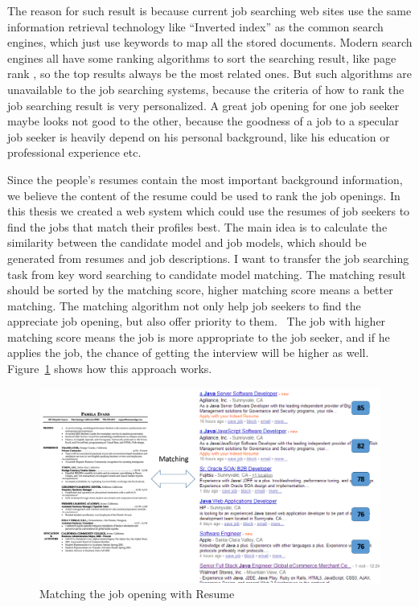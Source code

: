The reason for such result is because current job searching web sites use the same information retrieval technology like ``Inverted index'' \cite{zobel2006inverted} as the common search engines, which just use keywords to map all the stored documents. Modern search engines all have some ranking algorithms to sort the searching result, like page rank \cite{page1999pagerank}, so the top results always be the most related ones. But such algorithms are unavailable to the job searching systems, because the criteria  of how to rank the job searching result is very personalized. A great job opening for one job seeker maybe looks not good to the other, because the goodness of a job to a specular job seeker is heavily depend on his personal background, like his education or professional experience etc.

Since the people's resumes contain the most important background information, we believe the content of the resume could be used to rank the job openings. In this thesis we created a web system which could use the resumes of job seekers to find the jobs that match their profiles best. The main idea is to calculate the similarity between the candidate model and job models, which should be generated from resumes and job descriptions. I want to transfer the job searching task from key word searching to candidate model matching. The matching result should be sorted by the matching score, higher matching score means a better matching. The matching algorithm not only help job seekers to find the appreciate job opening, but also offer priority to them.~\cite{gueutal2006brave}  The job with higher matching score means the job is more appropriate to the job seeker, and if he applies the job, the chance of getting the interview will be higher as well. Figure~\ref{fig:Matching} shows how this approach works.


\begin{figure}[htbp]
  \centering
  \includegraphics[scale=0.5]{images/matching.png}
  \caption{Matching the job opening with Resume}
  \label{fig:Matching}
\end{figure}

